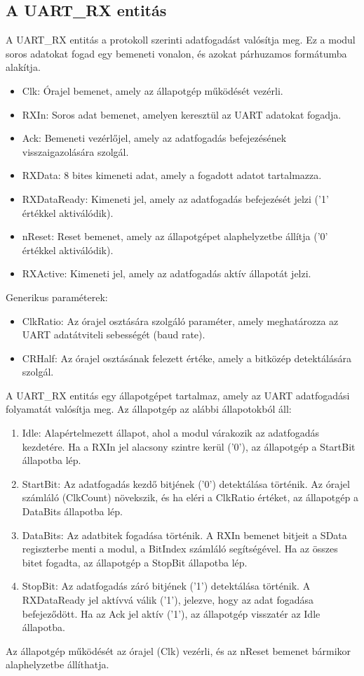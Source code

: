 \documentclass[a4paper,12pt,oneside]{book}
\begin{document}
\subsection{A UART\_RX entitás}
A UART\_RX entitás a protokoll szerinti adatfogadást valósítja meg. Ez a modul soros adatokat fogad egy bemeneti vonalon, és azokat párhuzamos formátumba alakítja.
\begin{itemize}
	\item Clk: Órajel bemenet, amely az állapotgép működését vezérli.
	\item RXIn: Soros adat bemenet, amelyen keresztül az UART adatokat fogadja.
	\item Ack: Bemeneti vezérlőjel, amely az adatfogadás befejezésének visszaigazolására szolgál.
	\item RXData: 8 bites kimeneti adat, amely a fogadott adatot tartalmazza.
	\item RXDataReady: Kimeneti jel, amely az adatfogadás befejezését jelzi ('1' értékkel aktiválódik).
	\item nReset: Reset bemenet, amely az állapotgépet alaphelyzetbe állítja ('0' értékkel aktiválódik).
	\item RXActive: Kimeneti jel, amely az adatfogadás aktív állapotát jelzi.
\end{itemize}
Generikus paraméterek:
\begin{itemize}
	\item ClkRatio: Az órajel osztására szolgáló paraméter, amely meghatározza az UART adatátviteli sebességét (baud rate).
	\item CRHalf: Az órajel osztásának felezett értéke, amely a bitközép detektálására szolgál.
\end{itemize}
A UART\_RX entitás egy állapotgépet tartalmaz, amely az UART adatfogadási folyamatát valósítja meg. Az állapotgép az alábbi állapotokból áll:
\begin{enumerate}
	\item Idle: Alapértelmezett állapot, ahol a modul várakozik az adatfogadás kezdetére. Ha a RXIn jel alacsony szintre kerül ('0'), az állapotgép a StartBit állapotba lép.
	\item StartBit: Az adatfogadás kezdő bitjének ('0') detektálása történik. Az órajel számláló (ClkCount) növekszik, és ha eléri a ClkRatio értéket, az állapotgép a DataBits állapotba lép.
	\item DataBits: Az adatbitek fogadása történik. A RXIn bemenet bitjeit a SData regiszterbe menti a modul, a BitIndex számláló segítségével. Ha az összes bitet fogadta, az állapotgép a StopBit állapotba lép.
	\item StopBit: Az adatfogadás záró bitjének ('1') detektálása történik. A RXDataReady jel aktívvá válik ('1'), jelezve, hogy az adat fogadása befejeződött. Ha az Ack jel aktív ('1'), az állapotgép visszatér az Idle állapotba.
\end{enumerate}
Az állapotgép működését az órajel (Clk) vezérli, és az nReset bemenet bármikor alaphelyzetbe állíthatja.
\end{document}
